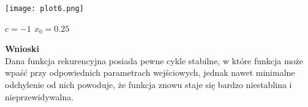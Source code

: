 \documentclass{article}
\begin{document}
\begin{center}
	\texttt{[image: plot6.png]}

  \textbf{$c=-1$ $x_0=0.25$}
\end{center}

\noindent \textbf{Wnioski} \\
Dana funkcja rekurencyjna posiada pewne cykle stabilne, w które funkcja
może wpaść przy odpowiednich parametrach wejściowych, jednak nawet minimalne
odchylenie od nich powoduje, że funkcja znowu staje się bardzo niestablina i
nieprzewidywalna.
\end{document}
